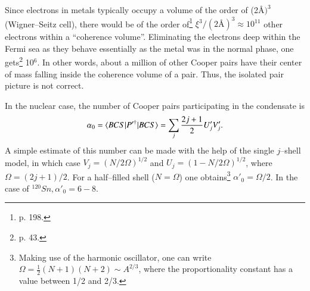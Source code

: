 \begin{subappendices}
Since electrons in metals typically occupy a volume of the order of (2\AA$)^3$ (Wigner--Seitz cell), there would be of the order of\footnote{\cite{Ketterson:99} p. 198.} $\xi^3/(2\text{\AA})^3\approx 10^{11}$ other electrons within a ``coherence volume''. Eliminating the electrons deep within the Fermi sea as they behave essentially as the metal was in the normal phase, one gets\footnote{\cite{Schrieffer:64} p. 43.} 10$^6$. In other words, about a million of other Cooper pairs have their center of mass falling inside the coherence volume of a pair. Thus, the isolated pair picture is not correct.
\newpage




 


 In the nuclear case, the number of Cooper pairs participating in the condensate is
 \begin{align}\label{eq3B11}
\alpha_0=\langle {BCS|P'^\dagger|BCS} \rangle=\sum_j\frac{2j+1}{2}U'_jV'_j.
 \end{align}
 A simple estimate of this number can be made with the help of the single $j$--shell model, in which case $V_j=(N/2\Omega)^{1/2}$ and $U_j=(1-N/2\Omega)^{1/2}$, where $\Omega=(2j+1)/2$. For a half--filled shell ($N=\Omega$) one obtains\footnote{Making use of the harmonic oscillator, one can write $\Omega=\frac{1}{2}(N+1)(N+2)\sim A^{2/3}$, where the proportionality constant has a value between 1/2 and 2/3.} $\alpha'_0=\Omega/2$. In the case of $^{120}Sn, \alpha'_0=6-8$. 
 

\end{subappendices}
